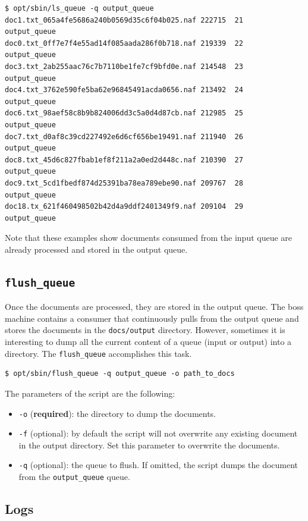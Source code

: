 \documentclass[a4]{article}
\begin{document}
\begin{verbatim}
$ opt/sbin/ls_queue -q output_queue
doc1.txt_065a4fe5686a240b0569d35c6f04b025.naf 222715  21   output_queue
doc0.txt_0ff7e7f4e55ad14f085aada286f0b718.naf 219339  22   output_queue
doc3.txt_2ab255aac76c7b7110be1fe7cf9bfd0e.naf 214548  23   output_queue
doc4.txt_3762e590fe5ba62e96845491acda0656.naf 213492  24   output_queue
doc6.txt_98aef58c8b9b824006dd3c5a0d4d87cb.naf 212985  25   output_queue
doc7.txt_d0af8c39cd227492e6d6cf656be19491.naf 211940  26   output_queue
doc8.txt_45d6c827fbab1ef8f211a2a0ed2d448c.naf 210390  27   output_queue
doc9.txt_5cd1fbedf874d25391ba78ea789ebe90.naf 209767  28   output_queue
doc18.tx_621f460498502b42d4a9ddf2401349f9.naf 209104  29   output_queue
\end{verbatim}

Note that these examples show documents consumed from the input queue are
already processed and stored in the output queue.

\subsection*{\texttt{flush\_queue}}
\label{sec:flush_queue}

Once the documents are processed, they are stored in the output queue. The
boss machine contains a consumer that continuously pulls from the output
queue and stores the documents in the \texttt{docs/output}
directory. However, sometimes it is interesting to dump all the current
content of a queue (input or output) into a directory. The
\texttt{flush\_queue} accomplishes this task.

\begin{verbatim}
$ opt/sbin/flush_queue -q output_queue -o path_to_docs
\end{verbatim}

The parameters of the script are the following:
\begin{itemize}
\item \texttt{-o} (\textbf{required}): the directory to dump the documents.
\item \texttt{-f} (optional): by default the script will not overwrite any
  existing document in the output directory. Set this parameter to overwrite
  the documents.
\item \texttt{-q} (optional): the queue to flush. If omitted, the script
  dumps the document from the \texttt{output\_queue} queue.
\end{itemize}

\subsection*{Logs}
\label{sec:logs}
\end{document}
